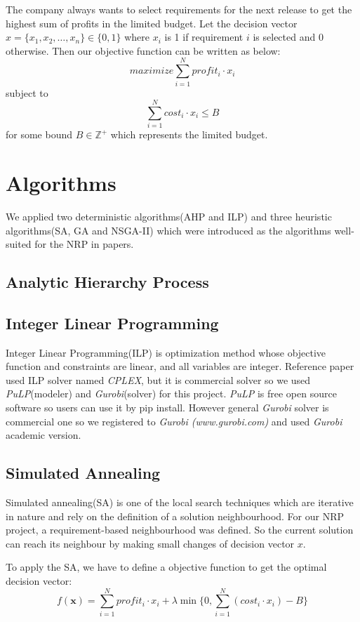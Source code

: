 The company always wants to select requirements for the next release to get the highest sum of profits in the limited budget. Let the decision vector $x = \{x_1, x_2, \ldots, x_n\} \in \{0, 1\}$ where $x_i$ is 1 if requirement $i$ is selected and 0 otherwise. Then our objective function can be written as below:
\[
maximize \sum_{i = 1}^{N} profit_i \cdot x_i
\]
subject to
\[
\sum_{i = 1}^{N} cost_i \cdot x_i \leq B
\]
for some bound $B \in \mathbb{Z}^+$ which represents the limited budget.



\section{Algorithms}
We applied two deterministic algorithms(AHP and ILP) and three heuristic algorithms(SA, GA and NSGA-II) which were introduced as the algorithms well-suited for the NRP in papers.\cite{NRP}\cite{ILP}\cite{IGA}\cite{MONRP}


\subsection{Analytic Hierarchy Process}

\subsection{Integer Linear Programming}
Integer Linear Programming(ILP) is optimization method whose objective function and constraints are linear, and all variables are integer. Reference paper used ILP solver named \textit{CPLEX}, but it is commercial solver so we used \textit{PuLP}(modeler) and \textit{Gurobi}(solver) for this project. \textit{PuLP} is free open source software so users can use it by pip install. However general \textit{Gurobi} solver is commercial one so we registered to \textit{Gurobi (www.gurobi.com)} and used \textit{Gurobi} academic version.

\subsection{Simulated Annealing}
Simulated annealing(SA) is one of the local search techniques which are iterative in nature and rely on the definition of a solution neighbourhood. For our NRP project, a requirement-based neighbourhood was defined. So the current solution can reach its neighbour by making small changes of decision vector $x$.

To apply the SA, we have to define a objective function to get the optimal decision vector:
\[
f(\textbf{x}) = \sum_{i = 1}^{N} profit_i \cdot x_i + \lambda \min \Big\{0, \sum_{i = 1}^{N} (cost_i \cdot x_i) - B \Big\}
\]


